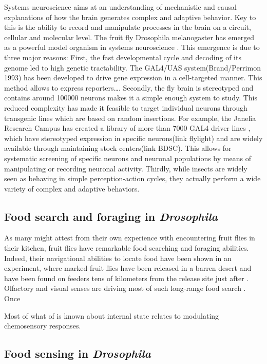 Systems neuroscience aims at an understanding of mechanistic and causal explanations of how the brain generates complex and adaptive behavior. Key to this is the ability to record and manipulate processes in the brain on a circuit, cellular and molecular level. The fruit fly Drosophila melanogaster has emerged as a powerful model organism in systems neuroscience \needscite. This emergence is due to three major reasons: First, the fast developmental cycle and decoding of its genome \needscite led to high genetic tractability. The GAL4/UAS system\needscite(Brand/Perrimon 1993) has been developed to drive gene expression in a cell-targeted manner. This method allows to express reporters…. Secondly, the fly brain is stereotyped and contains around 100000 neurons makes it a simple enough system to study. This reduced complexity has made it feasible to target individual neurons through transgenic lines which are based on random insertions. For example, the Janelia Research Campus has created a library of more than 7000 GAL4 driver lines \needscite, which have stereotyped expression in specific neurons\needscite(link flylight) and are widely available through maintaining stock centers\needscite(link BDSC). This allows for systematic screening of specific neurons and neuronal populations by means of manipulating or recording neuronal activity. Thirdly, while insects are widely seen as behaving in simple perception-action cycles, they actually  perform a wide variety of complex and adaptive behaviors.

\subsection{Food search and foraging in \textit{Drosophila}}
\label{sub:foodsearch}

As many might attest from their own experience with encountering fruit flies in their kitchen, fruit flies have remarkable food searching and foraging abilities. Indeed, their navigational abilities to locate food have been shown in an experiment, where marked fruit flies have been released in a barren desert and have been found on feeders tens of kilometers from the release site just  after \needscite. Olfactory and visual senses are driving most of such long-range food search \needscite. Once

Most of what of is known about internal state relates to modulating chemosensory responses.


\subsection{Food sensing in \textit{Drosophila}}
\label{sub:foodsense}


